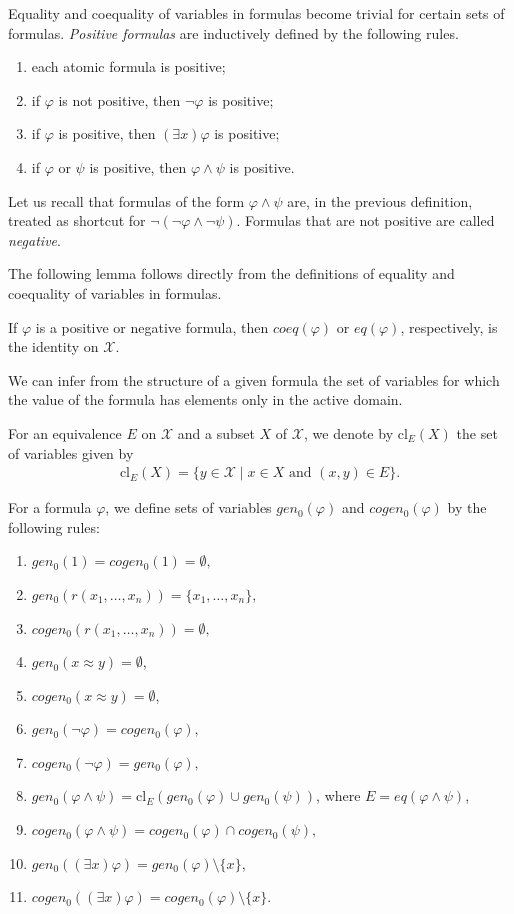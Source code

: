 \documentclass{lmcs}
\def\tu#1{( #1)}
\def\X{\mathcal X}
\def\eq{eq}
\def\coeq{coeq}
\def\cl{\textrm{cl}}
\def\gen{gen}
\def\cogen{cogen}
\def\genz{\gen_0}
\def\cogenz{\cogen_0}
\newcommand{\st}{%
	\ensuremath{\;|\;}
}
\begin{document}
Equality and coequality of variables in formulas become trivial for certain sets of formulas. \emph{Positive formulas}  are inductively defined by the following rules.
\begin{enumerate}
\item each atomic formula is positive;
\item if $\varphi$ is not positive, then $\neg\varphi$ is positive;
\item if $\varphi$ is positive, then $(\exists x)\varphi$ is positive;
\item if $\varphi$ or $\psi$ is positive, then $\varphi\wedge\psi$ is positive.
\end{enumerate}
Let us recall that formulas of the form $\varphi\wedge\psi$ are, in the previous definition, treated as shortcut for $\neg(\neg\varphi\wedge\neg\psi)$. 
Formulas that are not positive are called \emph{negative}.

The following lemma follows directly from the definitions of equality and coequality of variables in formulas.
\begin{lem}\label{lem:pos_neg_coeq_eq}
If $\varphi$ is a positive or negative formula, then $\coeq(\varphi)$ or $\eq(\varphi)$, respectively, is the identity on $\X$. 
\end{lem}

We can infer from the structure of a given formula the set of variables for which the value of the formula has elements only in the active domain.

For an equivalence $E$ on $\X$ and a subset $X$ of $\X$, we denote by $\cl_E(X)$ the set of variables given by
\begin{align}
\cl_E(X)=\{y\in \X\st x\in X \textrm{ and }\tu{x,y}\in E\}. 
\end{align}

For a formula $\varphi$, we define sets of variables $\genz(\varphi)$ and $\cogenz(\varphi)$ by the following rules:
\begin{enumerate}
\item $\genz(1)=\cogenz(1)=\emptyset,$
\item $\genz(r(x_1,\ldots,x_n))=\{x_1,\ldots,x_n\},$
\item $\cogenz(r(x_1,\ldots,x_n))=\emptyset,$
\item $\genz(x\approx y)=\emptyset$,
\item $\cogenz(x\approx y)=\emptyset$,
\item $\genz(\neg\varphi)=\cogenz(\varphi),$
\item $\cogenz(\neg\varphi)=\genz(\varphi),$
\item $\genz(\varphi\wedge\psi)=\cl_E(\genz(\varphi)\cup\genz(\psi))$, where $E=\eq(\varphi\wedge\psi)$,
\item $\cogenz(\varphi\wedge\psi)=\cogenz(\varphi)\cap\cogenz(\psi),$
\item $\genz((\exists x)\varphi)=\genz(\varphi)\setminus\{x\}$,
\item $\cogenz((\exists x)\varphi)=\cogenz(\varphi)\setminus\{x\}$.
\end{enumerate}
\end{document}

